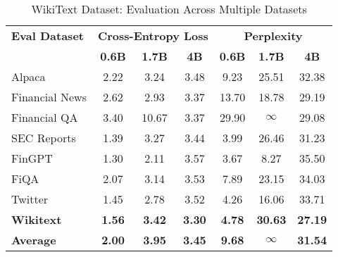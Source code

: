 
\begin{table}[htbp]
\centering
\caption[WikiText: Evaluation Results]{WikiText Dataset: Evaluation Across Multiple Datasets}
\label{tab:wikitext_results}
\begin{tabular}{l|ccc|ccc}
\hline
\textbf{Eval Dataset} & \multicolumn{3}{c|}{\textbf{Cross-Entropy Loss}} & \multicolumn{3}{c}{\textbf{Perplexity}} \\
\cline{2-4} \cline{5-7}
  & \textbf{0.6B} & \textbf{1.7B} & \textbf{4B} & \textbf{0.6B} & \textbf{1.7B} & \textbf{4B} \\
Alpaca & 2.22 & 3.24 & 3.48 & 9.23 & 25.51 & 32.38 \\
Financial News & 2.62 & 2.93 & 3.37 & 13.70 & 18.78 & 29.19 \\
Financial QA & 3.40 & 10.67 & 3.37 & 29.90 & $\infty$ & 29.08 \\
SEC Reports & 1.39 & 3.27 & 3.44 & 3.99 & 26.46 & 31.23 \\
FinGPT & 1.30 & 2.11 & 3.57 & 3.67 & 8.27 & 35.50 \\
FiQA & 2.07 & 3.14 & 3.53 & 7.89 & 23.15 & 34.03 \\
Twitter & 1.45 & 2.78 & 3.52 & 4.26 & 16.06 & 33.71 \\
\textbf{Wikitext} & \textbf{1.56} & \textbf{3.42} & \textbf{3.30} & \textbf{4.78} & \textbf{30.63} & \textbf{27.19} \\
\hline
\textbf{Average} & \textbf{2.00} & \textbf{3.95} & \textbf{3.45} & \textbf{9.68} & \textbf{$\infty$} & \textbf{31.54} \\
\hline
\end{tabular}
\end{table}
